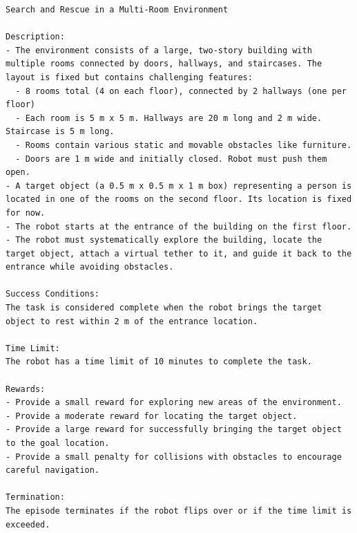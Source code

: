 \begin{lstlisting}[language={}]
Search and Rescue in a Multi-Room Environment

Description: 
- The environment consists of a large, two-story building with multiple rooms connected by doors, hallways, and staircases. The layout is fixed but contains challenging features:
  - 8 rooms total (4 on each floor), connected by 2 hallways (one per floor)
  - Each room is 5 m x 5 m. Hallways are 20 m long and 2 m wide. Staircase is 5 m long.
  - Rooms contain various static and movable obstacles like furniture.
  - Doors are 1 m wide and initially closed. Robot must push them open.
- A target object (a 0.5 m x 0.5 m x 1 m box) representing a person is located in one of the rooms on the second floor. Its location is fixed for now.
- The robot starts at the entrance of the building on the first floor.
- The robot must systematically explore the building, locate the target object, attach a virtual tether to it, and guide it back to the entrance while avoiding obstacles.

Success Conditions:
The task is considered complete when the robot brings the target object to rest within 2 m of the entrance location. 

Time Limit:
The robot has a time limit of 10 minutes to complete the task.

Rewards:
- Provide a small reward for exploring new areas of the environment.
- Provide a moderate reward for locating the target object.
- Provide a large reward for successfully bringing the target object to the goal location.
- Provide a small penalty for collisions with obstacles to encourage careful navigation.

Termination:
The episode terminates if the robot flips over or if the time limit is exceeded.
\end{lstlisting}
